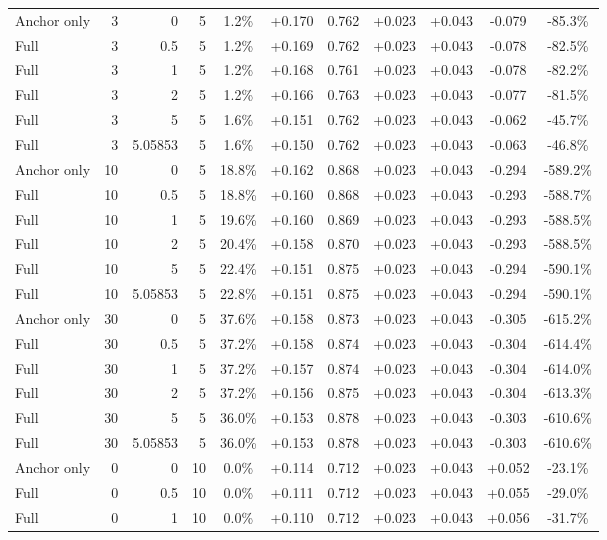 \begin{table}[htbp]
\begin{tabular}{lrrrccccccc}
Anchor only & 3 & 0 & 5 & 1.2\% & +0.170 & 0.762 & +0.023 & +0.043 & -0.079 & -85.3\% \\
Full & 3 & 0.5 & 5 & 1.2\% & +0.169 & 0.762 & +0.023 & +0.043 & -0.078 & -82.5\% \\
Full & 3 & 1 & 5 & 1.2\% & +0.168 & 0.761 & +0.023 & +0.043 & -0.078 & -82.2\% \\
Full & 3 & 2 & 5 & 1.2\% & +0.166 & 0.763 & +0.023 & +0.043 & -0.077 & -81.5\% \\
Full & 3 & 5 & 5 & 1.6\% & +0.151 & 0.762 & +0.023 & +0.043 & -0.062 & -45.7\% \\
Full & 3 & 5.05853 & 5 & 1.6\% & +0.150 & 0.762 & +0.023 & +0.043 & -0.063 & -46.8\% \\
Anchor only & 10 & 0 & 5 & 18.8\% & +0.162 & 0.868 & +0.023 & +0.043 & -0.294 & -589.2\% \\
Full & 10 & 0.5 & 5 & 18.8\% & +0.160 & 0.868 & +0.023 & +0.043 & -0.293 & -588.7\% \\
Full & 10 & 1 & 5 & 19.6\% & +0.160 & 0.869 & +0.023 & +0.043 & -0.293 & -588.5\% \\
Full & 10 & 2 & 5 & 20.4\% & +0.158 & 0.870 & +0.023 & +0.043 & -0.293 & -588.5\% \\
Full & 10 & 5 & 5 & 22.4\% & +0.151 & 0.875 & +0.023 & +0.043 & -0.294 & -590.1\% \\
Full & 10 & 5.05853 & 5 & 22.8\% & +0.151 & 0.875 & +0.023 & +0.043 & -0.294 & -590.1\% \\
Anchor only & 30 & 0 & 5 & 37.6\% & +0.158 & 0.873 & +0.023 & +0.043 & -0.305 & -615.2\% \\
Full & 30 & 0.5 & 5 & 37.2\% & +0.158 & 0.874 & +0.023 & +0.043 & -0.304 & -614.4\% \\
Full & 30 & 1 & 5 & 37.2\% & +0.157 & 0.874 & +0.023 & +0.043 & -0.304 & -614.0\% \\
Full & 30 & 2 & 5 & 37.2\% & +0.156 & 0.875 & +0.023 & +0.043 & -0.304 & -613.3\% \\
Full & 30 & 5 & 5 & 36.0\% & +0.153 & 0.878 & +0.023 & +0.043 & -0.303 & -610.6\% \\
Full & 30 & 5.05853 & 5 & 36.0\% & +0.153 & 0.878 & +0.023 & +0.043 & -0.303 & -610.6\% \\
Anchor only & 0 & 0 & 10 & 0.0\% & +0.114 & 0.712 & +0.023 & +0.043 & +0.052 & -23.1\% \\
Full & 0 & 0.5 & 10 & 0.0\% & +0.111 & 0.712 & +0.023 & +0.043 & +0.055 & -29.0\% \\
Full & 0 & 1 & 10 & 0.0\% & +0.110 & 0.712 & +0.023 & +0.043 & +0.056 & -31.7\% \\

\end{tabular}
\end{table}
